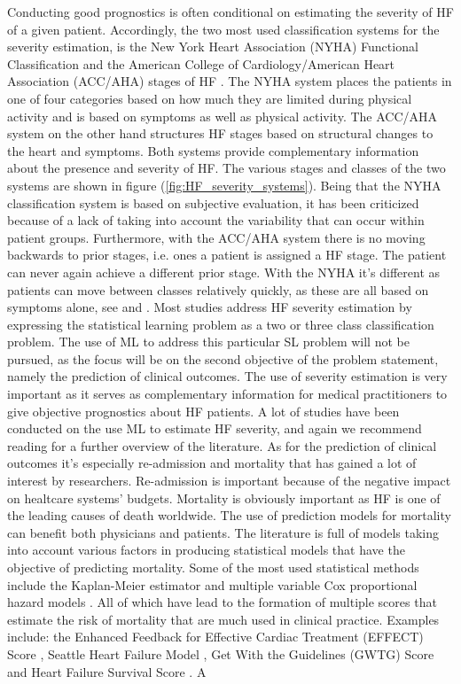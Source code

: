 \documentclass[../thesis.tex]{subfiles}
\begin{document}
\indent Conducting good prognostics is often conditional on estimating the severity of HF of a given patient. Accordingly, the two most used classification systems for the severity estimation, is the New York Heart Association (NYHA) Functional Classification \citep{new1994nomenclature} and the American College of Cardiology/American Heart Association (ACC/AHA) stages of HF \citep{hunt2001acc}. The NYHA system places the patients in one of four categories based on how much they are limited during physical activity and is based on symptoms as well as physical activity. The ACC/AHA system on the other hand structures HF stages based on structural changes to the heart and symptoms. Both systems provide complementary information about the presence and severity of HF. The various stages and classes of the two systems are shown in figure (\ref{fig:HF_severity_systems}). Being that the NYHA classification system is based on subjective evaluation, it has been criticized because of a lack of taking into account the variability that can occur within patient groups. Furthermore, with the ACC/AHA system there is no moving backwards to prior stages, i.e. ones a patient is assigned a HF stage. The patient can never again achieve a different prior stage. With the NYHA it's different as patients can move between classes relatively quickly, as these are all based on symptoms alone, see \cite{fleg2000assessment} and \cite{yancy2013}. Most studies address HF severity estimation by expressing the statistical learning problem as a two or three class classification problem. The use of ML to address this particular SL problem will not be pursued, as the focus will be on the second objective of the problem statement, namely the prediction of clinical outcomes. The use of severity estimation is very important as it serves as complementary information for medical practitioners to give objective prognostics about HF patients. A lot of studies have been conducted on the use ML to estimate HF severity, and again we recommend reading \cite{tripoliti2017heart} for a further overview of the literature. As for the prediction of clinical outcomes it's especially re-admission and mortality that has gained a lot of interest by researchers. Re-admission is important because of the negative impact on healtcare systems' budgets. Mortality is obviously important as HF is one of the leading causes of death worldwide. The use of prediction models for mortality can benefit both physicians and patients. The literature is full of models taking into account various factors in producing statistical models that have the objective of predicting mortality. Some of the most used statistical methods include the Kaplan-Meier estimator \citep{kaplan1958nonparametric} and multiple variable Cox proportional hazard models \citep{cox1972regression}. All of which have lead to the formation of multiple scores that estimate the risk of mortality that are much used in clinical practice. Examples include: the Enhanced Feedback for Effective Cardiac Treatment (EFFECT) Score \citep{lee2003predicting}, Seattle Heart Failure Model \citep{levy2006seattle}, Get With the Guidelines (GWTG) Score \citep{peterson2010validated} and Heart Failure Survival Score \citep{ketchum2011multivariate}. A 
\end{document}
